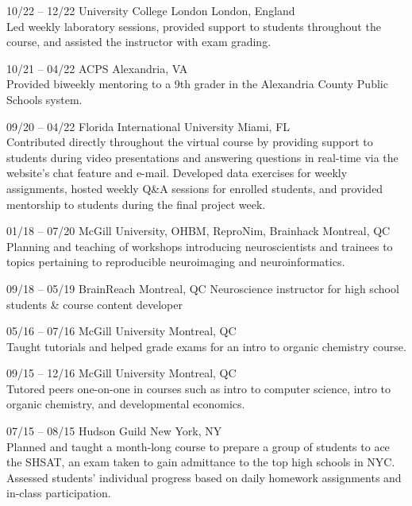 \documentclass[]{friggeri-cv} %
\begin{document}
\begin{entrylist}

\entry
{10/22 -- 12/22}
{University College London}
{London, England}
{ \\
Led weekly laboratory sessions, provided support to students throughout the course, and assisted the instructor with exam grading.}

\entry
{10/21 -- 04/22}
{ACPS}
{Alexandria, VA}
{} \\
Provided biweekly mentoring to a 9th grader in the Alexandria County Public Schools system. 

\entry
{09/20 -- 04/22}
{Florida International University}
{Miami, FL}
{ \\
Contributed directly throughout the virtual course by providing support to students
during video presentations and answering questions in real-time via the website’s chat
feature and e-mail. Developed data exercises for weekly assignments, hosted weekly Q\&A sessions for enrolled students, 
and provided mentorship to students during the final project week.}

\entry
{01/18 -- 07/20}
{McGill University, OHBM, ReproNim, Brainhack}
{Montreal, QC}
{ \\
Planning and teaching of workshops introducing neuroscientists and trainees to
topics pertaining to reproducible neuroimaging and neuroinformatics.}

\entry
{09/18 -- 05/19}
{BrainReach}
{Montreal, QC}
{Neuroscience instructor for high school students \& course content developer}

\entry
{05/16 -- 07/16}
{McGill University}
{Montreal, QC}
{ \\
Taught tutorials and helped grade exams for an intro to organic chemistry course.
}

\entry
{09/15 -- 12/16}
{McGill University}
{Montreal, QC}
{ \\
Tutored peers one-on-one in courses such as intro to computer science, intro to organic chemistry,
and developmental economics.
}

\entry
{07/15 -- 08/15}
{Hudson Guild}
{New York, NY}
{ \\
Planned and taught a month-long course to prepare a group of students to ace the SHSAT, 
an exam taken to gain admittance to the top high schools in NYC. Assessed students'
individual progress based on daily homework assignments and in-class participation.}

\end{entrylist}
\end{document}
